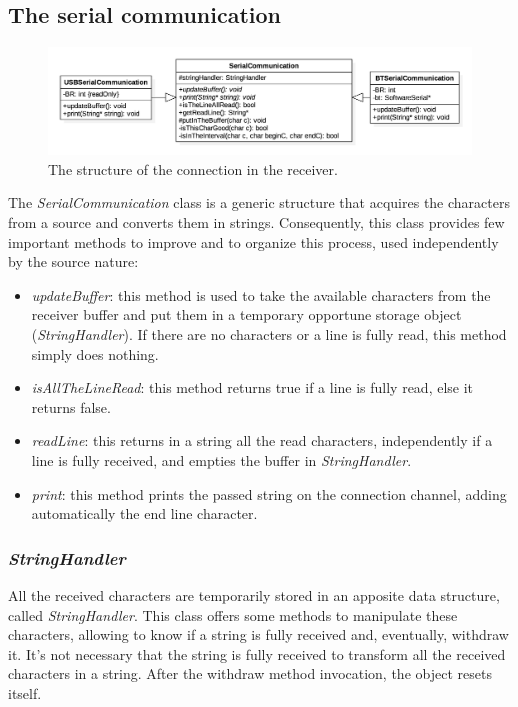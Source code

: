 \subsection{The serial communication}
\begin{figure}[h!]
	\centering
	\hspace*{-0.25 \textwidth}\includegraphics[width= 1.5\textwidth]
	{files/images/ArduinoConnection}
	\caption{The structure of the connection in the receiver.}
	\label{fig:connection}
\end{figure}
The \textit{SerialCommunication} class is a generic structure that acquires the characters from a source and converts them in strings. Consequently, this class provides few important methods to improve and to organize this process, used independently by the source nature:
\begin{itemize}
	\item \textit{updateBuffer}: this method is used to take the available characters from the receiver buffer and put them in a temporary opportune storage object (\textit{StringHandler}). If there are no characters or a line is fully read, this method simply does nothing.
	\item \textit{isAllTheLineRead}: this method returns true if a line is fully read, else it returns false.
	\item \textit{readLine}: this returns in a string all the read characters, independently if a line is fully received, and empties the buffer in \textit{StringHandler}.
	\item \textit{print}: this method prints the passed string on the connection channel, adding automatically the end line character.
\end{itemize}

\subsubsection{\textit{StringHandler}}
All the received characters are temporarily stored in an apposite data structure, called \textit{StringHandler}. This class offers some methods to manipulate these characters, allowing to know if a string is fully received and, eventually, withdraw it. It's not necessary that the string is fully received to transform all the received characters in a string. After the withdraw method invocation, the object resets itself.

